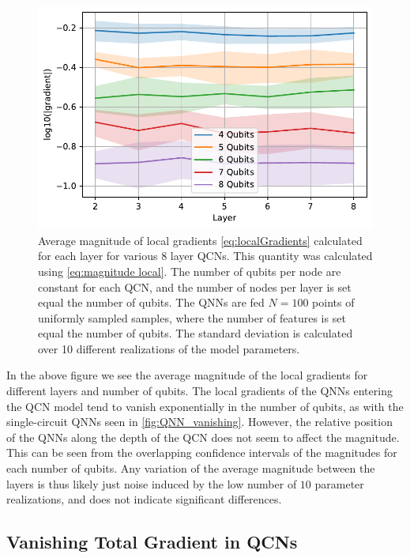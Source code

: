\begin{figure}[H]
    \centering
    \includegraphics[width=12cm]{latex/figures/vanishing_gradient_partial_input.pdf}
    \caption{Average magnitude of local gradients \autoref{eq:localGradients} calculated for each layer for various 8 layer QCNs. This quantity was calculated using \autoref{eq:magnitude local}. The number of qubits per node are constant for each QCN, and the number of nodes per layer is set equal the number of qubits. The QNNs are fed $N=100$ points of uniformly sampled samples, where the number of features is set equal the number of qubits. The standard deviation is calculated over 10 different realizations of the model parameters.}
    \label{fig:QCN_local_vanishing}
\end{figure}

In the above figure we see the average magnitude of the local gradients for different layers and number of qubits. The local gradients of the QNNs entering the QCN model tend to vanish exponentially in the number of qubits, as with the single-circuit QNNs seen in \autoref{fig:QNN_vanishing}. However, the relative position of the QNNs along the depth of the QCN does not seem to affect the magnitude. This can be seen from the overlapping confidence intervals of the magnitudes for each number of qubits. Any variation of the average magnitude between the layers is thus likely just noise induced by the low number of $10$ parameter realizations, and does not indicate significant differences.

\subsection{Vanishing Total Gradient in QCNs}\label{sec:Vanishing Total Gradients in QCNs}

